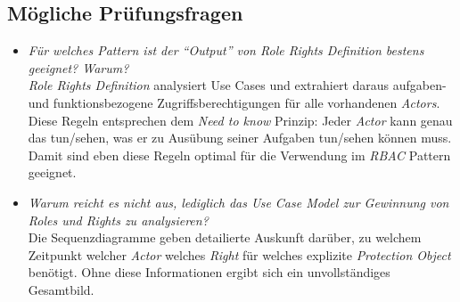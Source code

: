 \subsection*{Mögliche Prüfungsfragen}
\begin{itemize}
	\item \emph{Für welches Pattern ist der ``Output'' von Role Rights Definition bestens geeignet? Warum?}\\
	\emph{Role Rights Definition} analysiert Use Cases und extrahiert daraus aufgaben- und funktionsbezogene Zugriffsberechtigungen für alle vorhandenen \emph{Actors}.\\
	Diese Regeln entsprechen dem \emph{Need to know} Prinzip: Jeder \emph{Actor} kann genau das tun/sehen, was er zu Ausübung seiner Aufgaben tun/sehen können muss.\\Damit sind eben diese Regeln optimal für die Verwendung im \emph{\gls{RBAC}} Pattern geeignet.

	\item \emph{Warum reicht es nicht aus, lediglich das Use Case Model zur Gewinnung von Roles und Rights zu analysieren?}\\
	Die Sequenzdiagramme geben detailierte Auskunft darüber, zu welchem Zeitpunkt welcher \emph{Actor} welches \emph{Right} für welches explizite \emph{Protection Object} benötigt. Ohne diese Informationen ergibt sich ein unvollständiges Gesamtbild.
\end{itemize}
